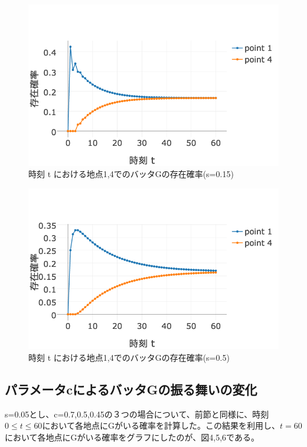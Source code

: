 \documentclass[11pt]{ltjsarticle}
\begin{document}
\begin{figure}
  \includegraphics[width=\textwidth]{fig2.png}
  \caption{時刻 t における地点1,4でのバッタGの存在確率(s=0.15)}
\end{figure}

\begin{figure}
  \includegraphics[width=\textwidth]{fig3.png}
  \caption{時刻 t における地点1,4でのバッタGの存在確率(s=0.5)}
\end{figure}

\subsection{パラメータcによるバッタGの振る舞いの変化}
	s=0.05とし、c=0.7,0.5,0.45の３つの場合について、前節と同様に、時刻$0 \leq t \leq 60$において各地点にGがいる確率を計算した。この結果を利用し、$t=60$において各地点にGがいる確率をグラフにしたのが、図4,5,6である。
\end{document}
